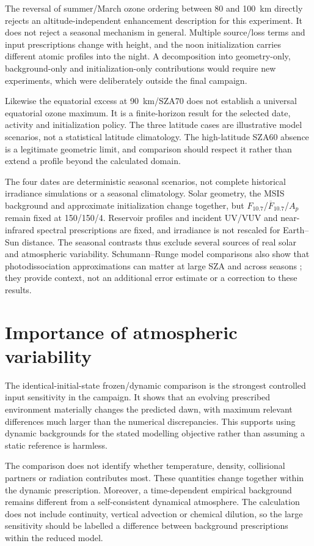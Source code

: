The reversal of summer/March ozone ordering between 80 and 100~km directly rejects an altitude-independent enhancement description for this experiment. It does not reject a seasonal mechanism in general. Multiple source/loss terms and input prescriptions change with height, and the noon initialization carries different atomic profiles into the night. A decomposition into geometry-only, background-only and initialization-only contributions would require new experiments, which were deliberately outside the final campaign.

Likewise the equatorial excess at 90~km/SZA70 does not establish a universal equatorial ozone maximum. It is a finite-horizon result for the selected date, activity and initialization policy. The three latitude cases are illustrative model scenarios, not a statistical latitude climatology. The high-latitude SZA60 absence is a legitimate geometric limit, and comparison should respect it rather than extend a profile beyond the calculated domain.

The four dates are deterministic seasonal scenarios, not complete historical irradiance simulations or a seasonal climatology. Solar geometry, the MSIS background and approximate initialization change together, but $F_{10.7}$/$\overline F_{10.7}$/$A_p$ remain fixed at 150/150/4. Reservoir profiles and incident UV/VUV and near-infrared spectral prescriptions are fixed, and irradiance is not rescaled for Earth--Sun distance. The seasonal contrasts thus exclude several sources of real solar and atmospheric variability. Schumann--Runge model comparisons also show that photodissociation approximations can matter at large SZA and across seasons \citep{koppers1996}; they provide context, not an additional error estimate or a correction to these results.

\section{Importance of atmospheric variability}
The identical-initial-state frozen/dynamic comparison is the strongest controlled input sensitivity in the campaign. It shows that an evolving prescribed environment materially changes the predicted dawn, with maximum relevant differences much larger than the numerical discrepancies. This supports using dynamic backgrounds for the stated modelling objective rather than assuming a static reference is harmless.

The comparison does not identify whether temperature, density, collisional partners or radiation contributes most. These quantities change together within the dynamic prescription. Moreover, a time-dependent empirical background remains different from a self-consistent dynamical atmosphere. The calculation does not include continuity, vertical advection or chemical dilution, so the large sensitivity should be labelled a difference between background prescriptions within the reduced model.

